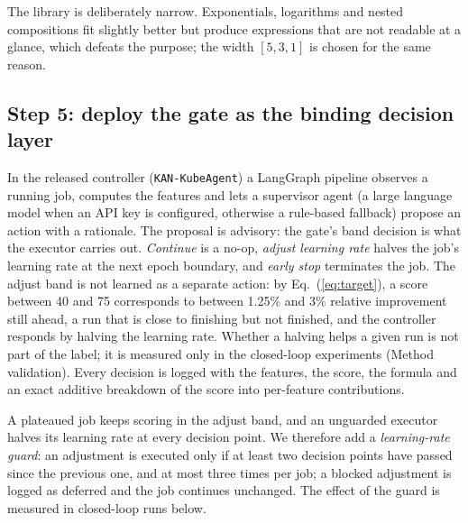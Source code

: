 The library is deliberately narrow. Exponentials, logarithms and nested compositions fit slightly better but produce expressions that are not readable at a glance, which defeats the purpose; the width $[5,3,1]$ is chosen for the same reason.

\subsection*{Step 5: deploy the gate as the binding decision layer}
In the released controller (\texttt{KAN-KubeAgent}) a LangGraph pipeline observes a running job, computes the features and lets a supervisor agent (a large language model when an API key is configured, otherwise a rule-based fallback) propose an action with a rationale. The proposal is advisory: the gate's band decision is what the executor carries out. \emph{Continue} is a no-op, \emph{adjust learning rate} halves the job's learning rate at the next epoch boundary, and \emph{early stop} terminates the job. The adjust band is not learned as a separate action: by Eq.~(\ref{eq:target}), a score between 40 and 75 corresponds to between 1.25\% and 3\% relative improvement still ahead, a run that is close to finishing but not finished, and the controller responds by halving the learning rate. Whether a halving helps a given run is not part of the label; it is measured only in the closed-loop experiments (Method validation). Every decision is logged with the features, the score, the formula and an exact additive breakdown of the score into per-feature contributions.

A plateaued job keeps scoring in the adjust band, and an unguarded executor halves its learning rate at every decision point. We therefore add a \emph{learning-rate guard}: an adjustment is executed only if at least two decision points have passed since the previous one, and at most three times per job; a blocked adjustment is logged as deferred and the job continues unchanged. The effect of the guard is measured in closed-loop runs below.

